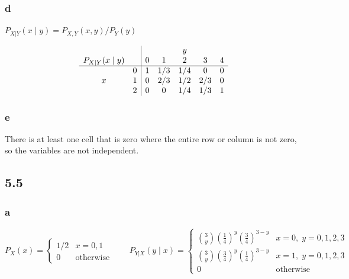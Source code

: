 \documentclass{article}
\begin{document}
\subsubsection*{d}

$P_{X|Y}(x \mid y) = P_{X,Y}(x,y) / P_Y(y)$

\[
	\begin{array}{cc|ccccc}
		                 &   & \multicolumn{5}{c}{y}                       \\
		P_{X|Y}(x\mid y) &   & 0                     & 1   & 2   & 3   & 4 \\ \hline
		                 & 0 & 1                     & 1/3 & 1/4 & 0   & 0 \\
		x                & 1 & 0                     & 2/3 & 1/2 & 2/3 & 0 \\
		                 & 2 & 0                     & 0   & 1/4 & 1/3 & 1 \\
	\end{array}
\]

\subsubsection*{e}

There is at least one cell that is zero where the entire row or column is not zero, so the variables are not independent.

\subsection*{5.5}

\subsubsection*{a}

\[
	P_X(x) = \begin{cases} 1/2 & x = 0, 1 \\ 0 & \text{otherwise} \end{cases}
	\qquad
	P_{Y|X}(y \mid x) = \begin{cases}
		\binom{3}{y}\!\left(\tfrac{1}{4}\right)^y\!\left(\tfrac{3}{4}\right)^{3-y} & x = 0,\; y = 0,1,2,3 \\
		\binom{3}{y}\!\left(\tfrac{3}{4}\right)^y\!\left(\tfrac{1}{4}\right)^{3-y} & x = 1,\; y = 0,1,2,3 \\
		0                                                                          & \text{otherwise}
	\end{cases}
\]
\end{document}
